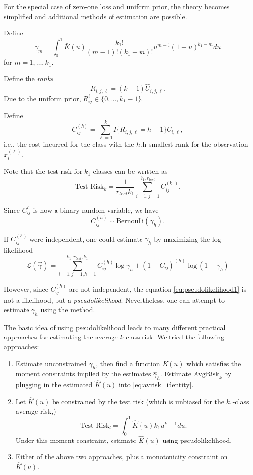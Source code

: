 \documentclass[12pt]{article}
\begin{document}
For the special case of zero-one loss and uniform prior, the theory
becomes simplified and additional methods of estimation are possible.

Define
\[
\gamma_m = \int_0^1 \bar{K}(u)  \frac{k_1!}{(m-1)!(k_1-m)!} u^{m-1} (1-u)^{k_1-m} du
\]
for $m = 1,\hdots, k_1$.

Define the \emph{ranks}
\[
R_{i, j, \ell} = (k-1)\hat{U}_{i, j, \ell}.
\]
Due to the uniform prior, $R_{ij}^\ell \in \{0,\hdots, k_1-1\}$.

Define
\[
C_{ij}^{(h)} = \sum_{\ell=1}^k I\{R_{i, j, \ell} = h - 1\} C_{i, \ell},
\]
i.e., the cost incurred for the class with the $h$th smallest rank for
the observation $x_i^{(\ell)}$.

Note that the test risk for $k_1$ classes can be written as
\[
\text{Test Risk}_k = \frac{1}{r_{test}k_1}\sum_{i=1,j=1}^{k_1,r_{test}} C_{ij}^{(k_1)}.
\]

Since $C_{ij}^\ell$ is now a binary random variable, we have
\[
C_{ij}^{(h)} \sim \text{Bernoulli}(\gamma_h).
\]

If $C_{ij}^{(h)}$ were independent, one could estimate $\gamma_h$ by
maximizing the log-likelihood
\begin{equation}\label{eq:pseudolikelihood1}
\mathcal{L}(\vec{\gamma}) = \sum_{i=1,j=1,h=1}^{k_1, r_{test}, k_1} C_{ij}^{(h)} \log \gamma_h + (1-C_{ij})^{(h)} \log (1-\gamma_h)
\end{equation}

However, since $C_{ij}^{(h)}$ are not independent, the equation
\eqref{eq:pseudolikelihood1} is not a likelihood, but a
\emph{pseudolikelihood}.  Nevertheless, one can attempt to estimate
$\gamma_h$ using the method.

The basic idea of using pseudolikelihood leads to many different
practical approaches for estimating the average $k$-class risk.  We tried the following approaches:
\begin{enumerate}
\item Estimate unconstrained $\gamma_h$, then find a function
  $\bar{K}(u)$ which satisfies the moment constraints implied by the
  estimates $\hat{\gamma}_h$.  Estimate $\text{AvgRisk}_k$ by plugging
  in the estimated $\hat{K}(u)$ into \eqref{eq:avrisk_identity}.
\item Let $\hat{K}(u)$ be constrained by the test risk (which is unbiased for the $k_1$-class average risk,)
\[
\text{Test Risk}_l = \int_0^1 \hat{K}(u) k_1 u^{k_1 -1} du.
\]
Under this moment constraint, estimate $\hat{K}(u)$ using pseudolikelihood.
\item Either of the above two approaches, plus a monotonicity constraint on $\hat{K}(u).$
\end{enumerate}
\end{document}
